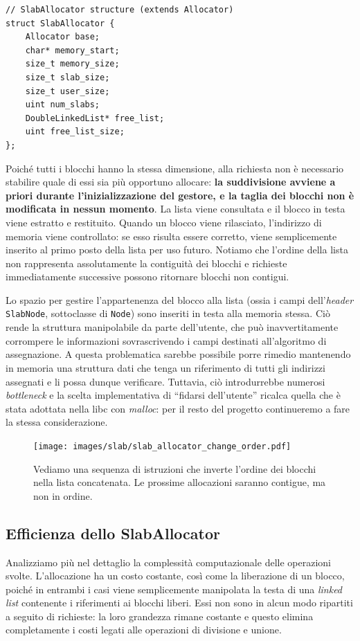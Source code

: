 \begin{lstlisting}
// SlabAllocator structure (extends Allocator)
struct SlabAllocator {
    Allocator base;
    char* memory_start;
    size_t memory_size;
    size_t slab_size;   
    size_t user_size;
    uint num_slabs;
    DoubleLinkedList* free_list;   
    uint free_list_size;
};
\end{lstlisting}


Poiché tutti i blocchi hanno la stessa dimensione, alla richiesta non è necessario stabilire quale di essi sia più opportuno allocare: \textbf{la suddivisione avviene a priori durante l’inizializzazione del gestore, e la taglia dei blocchi non è modificata in nessun momento}. La lista viene consultata e il blocco in testa viene estratto e restituito. Quando un blocco viene rilasciato, l’indirizzo di memoria viene controllato: se esso risulta essere corretto, viene semplicemente inserito al primo posto della lista per uso futuro. Notiamo che l’ordine della lista non rappresenta assolutamente la contiguità dei blocchi e richieste immediatamente successive possono ritornare blocchi non contigui.

Lo spazio per gestire l’appartenenza del blocco alla lista (ossia i campi dell'\textit{header} \texttt{SlabNode}, sottoclasse di \texttt{Node}) sono inseriti in testa alla memoria stessa. Ciò rende la struttura manipolabile da parte dell’utente, che può inavvertitamente corrompere le informazioni sovrascrivendo i campi destinati all'algoritmo di assegnazione. A questa problematica sarebbe possibile porre rimedio mantenendo in memoria una struttura dati che tenga un riferimento di tutti gli indirizzi assegnati e li possa dunque verificare. Tuttavia, ciò introdurrebbe numerosi \textit{bottleneck} e la scelta implementativa di “fidarsi dell’utente” ricalca quella che è stata adottata nella libc con \textit{malloc}: per il resto del progetto continueremo a fare la stessa considerazione.

\begin{figure}[H]
    \centering
    \texttt{[image: images/slab/slab\_allocator\_change\_order.pdf]}
    \caption{Vediamo una sequenza di istruzioni che inverte l'ordine dei blocchi nella lista concatenata. Le prossime allocazioni saranno contigue, ma non in ordine.}
    \label{fig:slab_allocator_change_order}
\end{figure}

\subsection*{Efficienza dello SlabAllocator}
Analizziamo più nel dettaglio la complessità computazionale delle operazioni svolte. L’allocazione ha un costo costante, così come la liberazione di un blocco, poiché in entrambi i casi viene semplicemente manipolata la testa di una \textit{linked list} contenente i riferimenti ai blocchi liberi. Essi non sono in alcun modo ripartiti a seguito di richieste: la loro grandezza rimane costante e questo elimina completamente i costi legati alle operazioni di divisione e unione.

